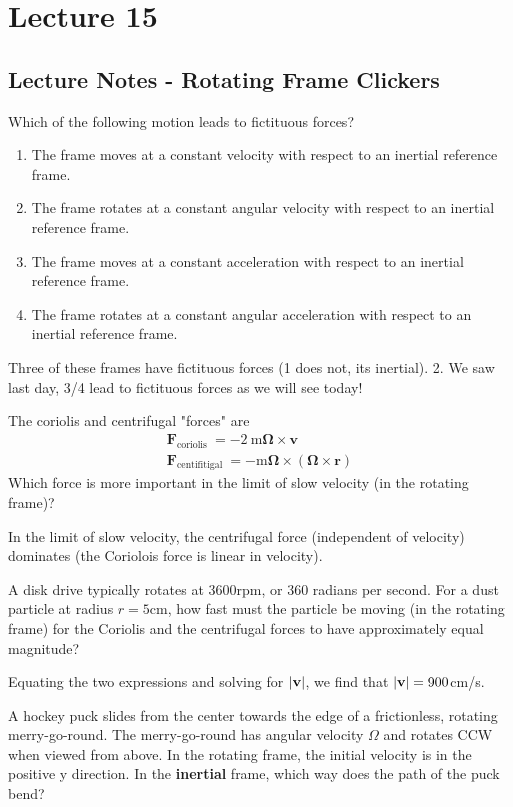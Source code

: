 \section{Lecture 15}
\subsection{Lecture Notes - Rotating Frame Clickers}
Which of the following motion leads to fictituous forces?
\begin{enumerate}[1.]
    \item The frame moves at a constant velocity with respect to an inertial reference frame.
    \item The frame rotates at a constant angular velocity with respect to an inertial reference frame.
    \item The frame moves at a constant acceleration with respect to an inertial reference frame.
    \item The frame rotates at a constant angular acceleration with respect to an inertial reference frame.
\end{enumerate}
\begin{s}
Three of these frames have fictituous forces (1 does not, its inertial). 2. We saw last day, 3/4 lead to fictituous forces as we will see today!
\end{s}
\noindent The coriolis and centrifugal "forces" are
$$
\begin{array}{l}
\mathbf{F}_{\text {coriolis }}=-2 \mathrm{~m} \boldsymbol{\Omega} \times \mathbf{v} \\
\mathbf{F}_{\text {centifitigal }}=-\mathrm{m} \boldsymbol{\Omega} \times(\boldsymbol{\Omega} \times \mathbf{r})
\end{array}
$$
Which force is more important in the limit of slow velocity (in the rotating frame)?
\begin{s}
In the limit of slow velocity, the centrifugal force (independent of velocity) dominates (the Coriolois force is linear in velocity).
\end{s}
A disk drive typically rotates at $3600$rpm, or $360$ radians per second. For a dust particle at radius $r = 5$cm, how fast must the particle be moving (in the rotating frame) for the Coriolis and the centrifugal forces to have approximately equal magnitude?
\begin{s}
Equating the two expressions and solving for $\abs{\mathbf{v}}$, we find that $\abs{\mathbf{v}} = 900$cm/s.
\end{s}
\noindent A hockey puck slides from the center towards the edge of a frictionless, rotating merry-go-round. The merry-go-round has angular velocity $\Omega$ and rotates CCW when viewed from above. In the rotating frame, the initial velocity is in the positive y direction. In the \textbf{inertial} frame, which way does the path of the puck bend?
